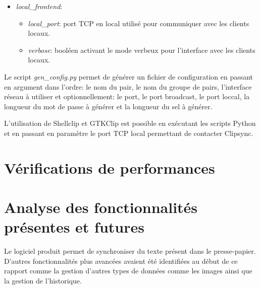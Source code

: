 \begin{itemize}
\begin{itemize}
    être copiées sur les autres pairs.
  \item \emph{keepalive\_delay}: délai en millisecondes après lequel la
    connexion est fermée si aucun message OK n'est reçu.
  \item \emph{keepalive\_interval}: interval en millisecondes utilisé pour
    l'envoi de messages OK.
  \item \emph{verbose}, \emph{verbose\_bcast}, \emph{verbose\_peer}:
    booléens permettant d'activer ou de désactiver le mode verbeux
    \footnote{Le mode verbeux permet d'afficher sur la sortie standard
    des informations sur l'activité du logiciel.} de Clipsync.
  \end{itemize}
\item \emph{local\_frontend}:
  \begin{itemize}
  \item \emph{local\_port}: port TCP en local utilisé pour communiquer avec les
    clients locaux.
  \item \emph{verbose}: booléen activant le mode verbeux pour l'interface avec
    les clients locaux.
  \end{itemize}
\end{itemize}

Le script \emph{gen\_config.py} permet de générer un fichier de configuration
en passant en argument dans l'ordre: le nom du pair, le nom du groupe de pairs,
l'interface réseau à utiliser et optionnellement: le port, le port broadcast,
le port loccal, la longueur du mot de passe à générer et la longueur du
sel à générer.

L'utilisation de Shellclip et GTKClip est possible en exécutant les scripts
Python et en passant en paramètre le port TCP local permettant de contacter
Clipsync.

\section{Vérifications de performances}

\section{Analyse des fonctionnalités présentes et
futures}
Le logiciel produit permet de synchroniser du texte présent dans le
presse-papier. D'autres fonctionnalités plus avancées avaient été identifiées
au début de ce rapport comme la gestion d'autres types de données comme
les images ainsi que la gestion de l'historique.

